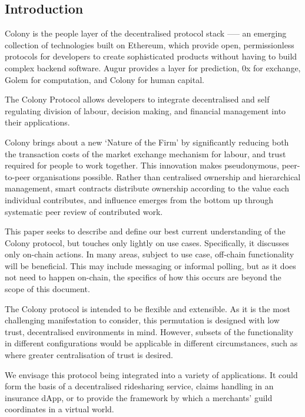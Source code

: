 \subsection*{Introduction}

Colony is the people layer of the decentralised protocol stack --— an emerging collection of technologies built on Ethereum, which provide open, permissionless protocols for developers to create sophisticated products without having to build complex backend software. Augur provides a layer for prediction, 0x for exchange, Golem for computation, and Colony for human capital.

The Colony Protocol allows developers to integrate decentralised and self regulating division of labour, decision making, and financial management into their applications.

Colony brings about a new `Nature of the Firm' \cite{The-Nature-of-the-Firm} by significantly reducing both the transaction costs of the market exchange mechanism for labour, and trust required for people to work together. This innovation makes pseudonymous, peer-to-peer organisations possible. Rather than centralised ownership and hierarchical management, smart contracts distribute ownership according to the value each individual contributes, and influence emerges from the bottom up through systematic peer review of contributed work.

This paper seeks to describe and define our best current understanding of the Colony protocol, but touches only lightly on use cases. Specifically, it discusses only on-chain actions. In many areas, subject to use case, off-chain functionality will be beneficial. This may include messaging or informal polling, but as it does not need to happen on-chain, the specifics of how this occurs are beyond the scope of this document.

The Colony protocol is intended to be flexible and extensible. As it is the most challenging manifestation to consider, this permutation is designed with low trust, decentralised environments in mind. However, subsets of the functionality in different configurations would be applicable in different circumstances, such as where greater centralisation of trust is desired.

We envisage this protocol being integrated into a variety of applications. It could form the basis of a decentralised ridesharing service, claims handling in an insurance dApp, or to provide the framework by which a merchants’ guild coordinates in a virtual world.







